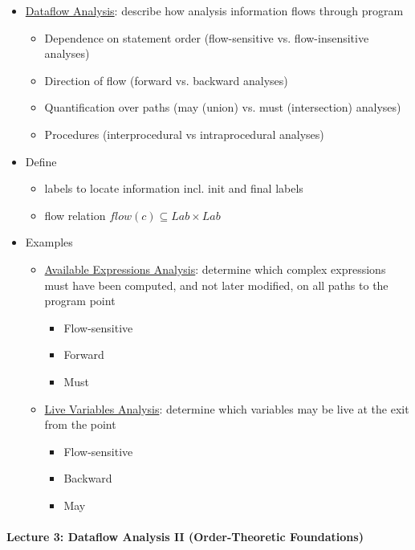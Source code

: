 \documentclass[a4paper,12pt]{article}
\begin{document}
\begin{itemize}
	\item \ul{Dataflow Analysis}: describe how analysis information flows through program
	\begin{itemize}
		\item Dependence on statement order (flow-sensitive vs. flow-insensitive analyses)
		\item Direction of flow (forward vs. backward analyses)
		\item Quantification over paths (may (union) vs. must (intersection) analyses)
		\item Procedures (interprocedural vs intraprocedural analyses)
	\end{itemize}
	\item Define 
	\begin{itemize}
		\item labels to locate information incl. init and final labels
		\item flow relation $flow(c) \subseteq Lab \times Lab$
	\end{itemize}
	\item Examples
	\begin{itemize}
		\item \ul{Available Expressions Analysis}: determine which complex expressions must have been computed, and not later modified, on all paths to the program point
		\begin{itemize}
			\item Flow-sensitive 
			\item Forward
			\item Must
		\end{itemize}
		\item \ul{Live Variables Analysis}: determine which variables may be live at the exit from the point
		\begin{itemize}
			\item Flow-sensitive 
			\item Backward
			\item May
		\end{itemize}
	\end{itemize}
\end{itemize}

\paragraph{Lecture 3: Dataflow Analysis II (Order-Theoretic Foundations)}
\end{document}
